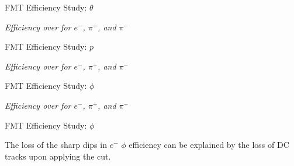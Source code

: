 \begin{frame}{FMT Efficiency Study: $\theta$}
    \begin{center}
        \vspace{-6pt}
        \begin{figure}[t]
        \end{figure}
        \textit{Efficiency over \ef{$\theta$} for $e^-$, $\pi^+$, and $\pi^-$}
    \end{center}

\end{frame}

\begin{frame}{FMT Efficiency Study: $p$}
    \begin{center}
        \vspace{-6pt}
        \begin{figure}[t]
        \end{figure}
        \textit{Efficiency over  for $e^-$, $\pi^+$, and $\pi^-$}
    \end{center}

\end{frame}

\begin{frame}{FMT Efficiency Study: $\phi$}
    \begin{center}
        \vspace{-6pt}
        \begin{figure}[t]
        \end{figure}
        \textit{Efficiency over \ef{$\phi$} for $e^-$, $\pi^+$, and $\pi^-$}
    \end{center}

\end{frame}

\begin{frame}{FMT Efficiency Study: $\phi$}
    \label{20.04::fmt_efficiency_study_end}

    The loss of the sharp dips in $e^-$ $\phi$ efficiency can be explained by the loss of DC tracks upon applying the cut.

    \begin{center}
        \begin{figure}[t]
        \end{figure}
    \end{center}

\end{frame}
